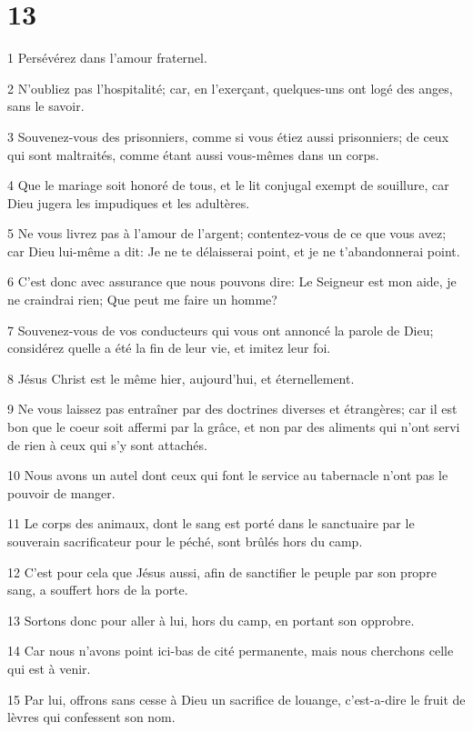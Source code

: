 \chapter{13}

\par 1 Persévérez dans l'amour fraternel.
\par 2 N'oubliez pas l'hospitalité; car, en l'exerçant, quelques-uns ont logé des anges, sans le savoir.
\par 3 Souvenez-vous des prisonniers, comme si vous étiez aussi prisonniers; de ceux qui sont maltraités, comme étant aussi vous-mêmes dans un corps.
\par 4 Que le mariage soit honoré de tous, et le lit conjugal exempt de souillure, car Dieu jugera les impudiques et les adultères.
\par 5 Ne vous livrez pas à l'amour de l'argent; contentez-vous de ce que vous avez; car Dieu lui-même a dit: Je ne te délaisserai point, et je ne t'abandonnerai point.
\par 6 C'est donc avec assurance que nous pouvons dire: Le Seigneur est mon aide, je ne craindrai rien; Que peut me faire un homme?
\par 7 Souvenez-vous de vos conducteurs qui vous ont annoncé la parole de Dieu; considérez quelle a été la fin de leur vie, et imitez leur foi.
\par 8 Jésus Christ est le même hier, aujourd'hui, et éternellement.
\par 9 Ne vous laissez pas entraîner par des doctrines diverses et étrangères; car il est bon que le coeur soit affermi par la grâce, et non par des aliments qui n'ont servi de rien à ceux qui s'y sont attachés.
\par 10 Nous avons un autel dont ceux qui font le service au tabernacle n'ont pas le pouvoir de manger.
\par 11 Le corps des animaux, dont le sang est porté dans le sanctuaire par le souverain sacrificateur pour le péché, sont brûlés hors du camp.
\par 12 C'est pour cela que Jésus aussi, afin de sanctifier le peuple par son propre sang, a souffert hors de la porte.
\par 13 Sortons donc pour aller à lui, hors du camp, en portant son opprobre.
\par 14 Car nous n'avons point ici-bas de cité permanente, mais nous cherchons celle qui est à venir.
\par 15 Par lui, offrons sans cesse à Dieu un sacrifice de louange, c'est-a-dire le fruit de lèvres qui confessent son nom.
